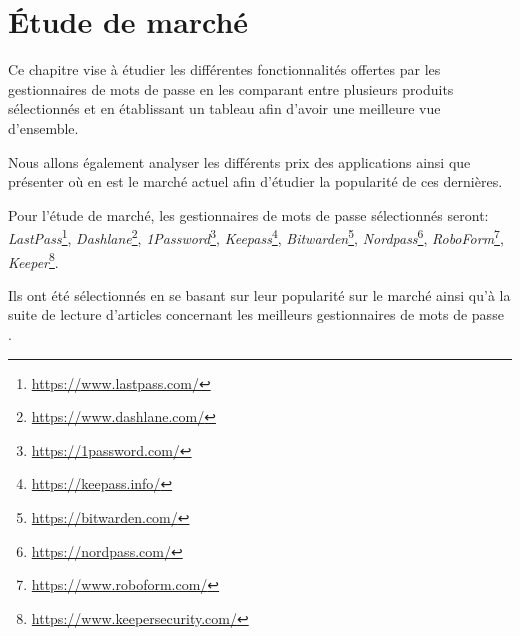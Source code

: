 


\chapter{Étude de marché}
\label{ch:etude_marche}
Ce chapitre vise à étudier les différentes fonctionnalités offertes par les gestionnaires de mots de passe en les comparant entre plusieurs produits sélectionnés et en établissant un tableau afin d'avoir une meilleure vue d'ensemble.

Nous allons également analyser les différents prix des applications ainsi que présenter où en est le marché actuel afin d'étudier la popularité de ces dernières.

Pour l'étude de marché, les gestionnaires de mots de passe sélectionnés seront: \textit{LastPass}\footnote{\href{https://www.lastpass.com/}{https://www.lastpass.com/}}, \textit{Dashlane}\footnote{\href{https://www.dashlane.com/}{https://www.dashlane.com/}}, \textit{1Password}\footnote{\href{https://1password.com/}{https://1password.com/}}, \textit{Keepass}\footnote{\href{https://keepass.info/}{https://keepass.info/}}, \textit{Bitwarden}\footnote{\href{https://bitwarden.com/}{https://bitwarden.com/}}, \textit{Nordpass}\footnote{\href{https://nordpass.com/}{https://nordpass.com/}}, \textit{RoboForm}\footnote{\href{https://www.roboform.com/}{https://www.roboform.com/}}, \textit{Keeper}\footnote{\href{https://www.keepersecurity.com/}{https://www.keepersecurity.com/}}.

Ils ont été sélectionnés en se basant sur leur popularité sur le marché ainsi qu'à la suite de lecture d'articles concernant les meilleurs gestionnaires de mots de passe \cite{BPM22}\cite{gallagher19}\cite{MSPM22}\cite{PM22}.

